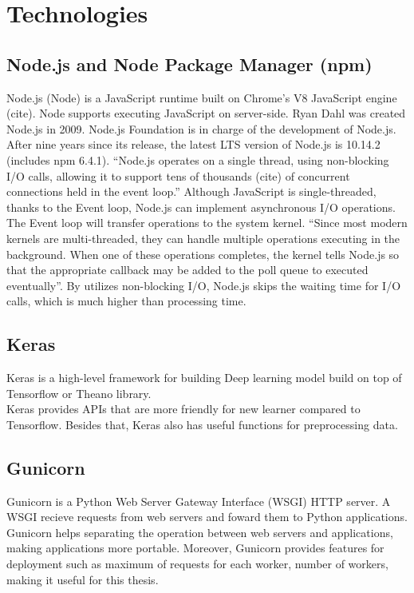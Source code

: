 \section{Technologies}
\subsection{Node.js and Node Package Manager (npm)}
Node.js (Node) is a JavaScript runtime built on Chrome's V8 JavaScript engine (cite). Node supports executing JavaScript on server-side. Ryan Dahl was created Node.js in 2009. Node.js Foundation is in charge of the development of Node.js. After nine years since its release, the latest LTS version of Node.js is 10.14.2 (includes npm 6.4.1). “Node.js operates on a single thread, using non-blocking I/O calls, allowing it to support tens of thousands (cite) of concurrent connections held in the event loop.” Although JavaScript is single-threaded, thanks to the Event loop, Node.js can implement asynchronous I/O operations. The Event loop will transfer operations to the system kernel. “Since most modern kernels are multi-threaded, they can handle multiple operations executing in the background. When one of these operations completes, the kernel tells Node.js so that the appropriate callback may be added to the poll queue to executed eventually”. By utilizes non-blocking I/O, Node.js skips the waiting time for I/O calls, which is much higher than processing time.
\subsection{Keras}
Keras is a high-level framework for building Deep learning model build on top of Tensorflow or Theano library.\\
Keras provides APIs that are more friendly for new learner compared to Tensorflow. Besides that, Keras also has useful functions for preprocessing data.
\subsection{Gunicorn}
Gunicorn is a Python Web Server Gateway Interface (WSGI) HTTP server. A WSGI recieve requests from web servers and foward them to Python applications.
Gunicorn helps separating the operation between web servers and applications, making applications more portable. Moreover, Gunicorn provides features for deployment such as maximum of requests for each worker, number of workers, making it useful for this thesis.

